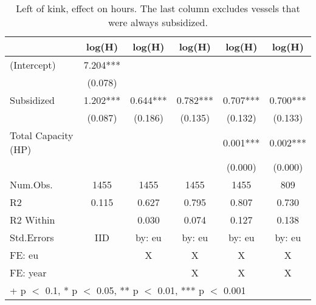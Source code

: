 \begin{table}

\caption{\label{tab:}Left of kink, effect on hours. The last column excludes vessels that were always subsidized.}
\centering
\begin{tabular}[t]{lccccc}
\toprule
  & log(H) & log(H)  & log(H)   & log(H)    & log(H)    \\
\midrule
(Intercept) & \num{7.204}*** &  &  &  & \\
 & (\num{0.078}) &  &  &  & \\
Subsidized & \num{1.202}*** & \num{0.644}*** & \num{0.782}*** & \num{0.707}*** & \num{0.700}***\\
 & (\num{0.087}) & (\num{0.186}) & (\num{0.135}) & (\num{0.132}) & (\num{0.133})\\
Total Capacity (HP) &  &  &  & \num{0.001}*** & \num{0.002}***\\
 &  &  &  & (\num{0.000}) & (\num{0.000})\\
\midrule
Num.Obs. & \num{1455} & \num{1455} & \num{1455} & \num{1455} & \num{809}\\
R2 & \num{0.115} & \num{0.627} & \num{0.795} & \num{0.807} & \num{0.730}\\
R2 Within &  & \num{0.030} & \num{0.074} & \num{0.127} & \num{0.138}\\
Std.Errors & IID & by: eu & by: eu & by: eu & by: eu\\
FE: eu &  & X & X & X & X\\
FE: year &  &  & X & X & X\\
\bottomrule
\multicolumn{6}{l}{\rule{0pt}{1em}+ p $<$ 0.1, * p $<$ 0.05, ** p $<$ 0.01, *** p $<$ 0.001}\\
\end{tabular}
\end{table}
